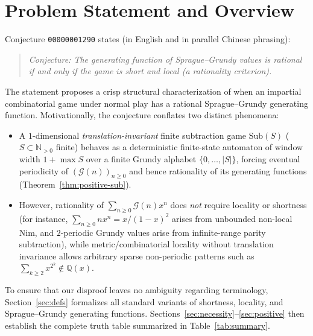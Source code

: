 \documentclass[11pt]{article}
\theoremstyle{definition}
\theoremstyle{remark}
\newcommand{\N}{\mathbb{N}}
\newcommand{\Q}{\mathbb{Q}}
\newcommand{\G}{\mathcal{G}}
\newcommand{\Sub}{\mathrm{Sub}}
\begin{document}
\section{Problem Statement and Overview}

Conjecture \texttt{00000001290} states (in English and in parallel Chinese phrasing):
\begin{quote}
\emph{Conjecture: The generating function of Sprague--Grundy values is rational if and only if the game is short and local (a rationality criterion).}
\end{quote}

The statement proposes a crisp structural characterization of when an impartial combinatorial game under normal play has a rational Sprague--Grundy generating function. Motivationally, the conjecture conflates two distinct phenomena:
\begin{itemize}
  \item A $1$-dimensional \emph{translation-invariant} finite subtraction game $\Sub(S)$ ($S \subset \N_{>0}$ finite) behaves as a deterministic finite-state automaton of window width $1 + \max S$ over a finite Grundy alphabet $\{0,\dots,|S|\}$, forcing eventual periodicity of $(\G(n))_{n \ge 0}$ and hence rationality of its generating functions (Theorem~\ref{thm:positive-sub}).
  \item However, rationality of $\sum_{n \ge 0} \G(n) x^n$ does \emph{not} require locality or shortness (for instance, $\sum_{n \ge 0} n x^n = x/(1-x)^2$ arises from unbounded non-local Nim, and $2$-periodic Grundy values arise from infinite-range parity subtraction), while metric/combinatorial locality without translation invariance allows arbitrary sparse non-periodic patterns such as $\sum_{k \ge 2} x^{2^k} \notin \Q(x)$.
\end{itemize}

To ensure that our disproof leaves no ambiguity regarding terminology, Section~\ref{sec:defs} formalizes all standard variants of shortness, locality, and Sprague--Grundy generating functions. Sections~\ref{sec:necessity}--\ref{sec:positive} then establish the complete truth table summarized in Table~\ref{tab:summary}.
\end{document}
